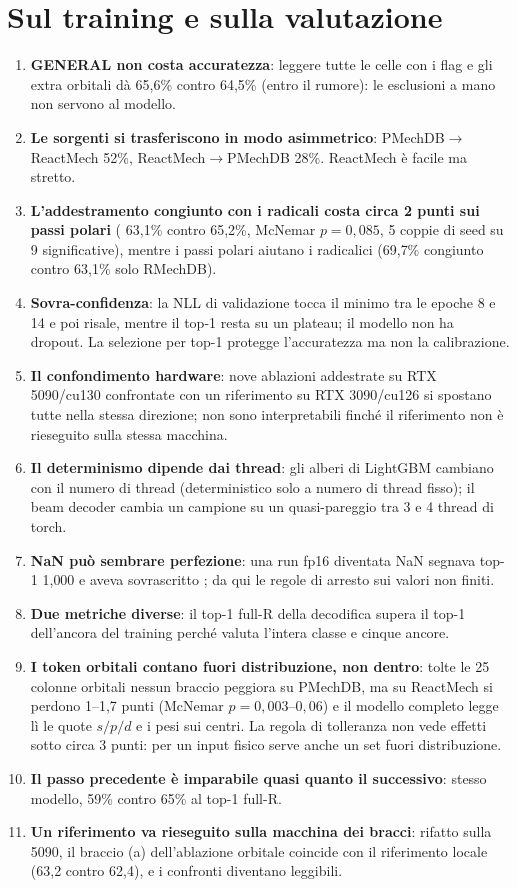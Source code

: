 \documentclass[11pt,a4paper]{report}
\newcommand{\code}[1]{\texttt{\detokenize{#1}}}
\begin{document}
\section{Sul training e sulla valutazione}
\begin{enumerate}[resume]
\item \textbf{GENERAL non costa accuratezza}: leggere tutte le celle con i flag e gli extra orbitali dà
  65{,}6\% contro 64{,}5\% (entro il rumore): le esclusioni a mano non servono al modello.
\item \textbf{Le sorgenti si trasferiscono in modo asimmetrico}: PMechDB$\to$ReactMech 52\%,
  ReactMech$\to$PMechDB 28\%. ReactMech è facile ma stretto.
\item \textbf{L'addestramento congiunto con i radicali costa circa 2 punti sui passi polari}
  (\code{joint} 63{,}1\% contro \code{pm_control} 65{,}2\%, McNemar $p=0{,}085$, 5 coppie di seed su 9
  significative), mentre i passi polari aiutano i radicalici (69{,}7\% congiunto contro 63{,}1\% solo
  RMechDB).
\item \textbf{Sovra-confidenza}: la NLL di validazione tocca il minimo tra le epoche 8 e 14 e poi
  risale, mentre il top-1 resta su un plateau; il modello non ha dropout. La selezione per top-1
  protegge l'accuratezza ma non la calibrazione.
\item \textbf{Il confondimento hardware}: nove ablazioni addestrate su RTX 5090/cu130 confrontate con
  un riferimento su RTX 3090/cu126 si spostano tutte nella stessa direzione; non sono interpretabili
  finché il riferimento non è rieseguito sulla stessa macchina.
\item \textbf{Il determinismo dipende dai thread}: gli alberi di LightGBM cambiano con il numero di
  thread (deterministico solo a numero di thread fisso); il beam decoder cambia un campione su un
  quasi-pareggio tra 3 e 4 thread di torch.
\item \textbf{NaN può sembrare perfezione}: una run fp16 diventata NaN segnava top-1 1{,}000 e aveva
  sovrascritto \code{best.pt}; da qui le regole di arresto sui valori non finiti.
\item \textbf{Due metriche diverse}: il top-1 full-R della decodifica supera il top-1 dell'ancora del
  training perché valuta l'intera classe e cinque ancore.
\item \textbf{I token orbitali contano fuori distribuzione, non dentro}: tolte le 25 colonne orbitali
  nessun braccio peggiora su PMechDB, ma su ReactMech si perdono 1--1{,}7 punti (McNemar
  $p=0{,}003$--$0{,}06$) e il modello completo legge lì le quote $s/p/d$ e i pesi sui centri. La regola di
  tolleranza non vede effetti sotto circa 3 punti: per un input fisico serve anche un set fuori
  distribuzione.
\item \textbf{Il passo precedente è imparabile quasi quanto il successivo}: stesso modello, 59\% contro
  65\% al top-1 full-R.
\item \textbf{Un riferimento va rieseguito sulla macchina dei bracci}: rifatto sulla 5090, il braccio (a)
  dell'ablazione orbitale coincide con il riferimento locale (63{,}2 contro 62{,}4), e i confronti
  diventano leggibili.
\end{enumerate}
\end{document}
